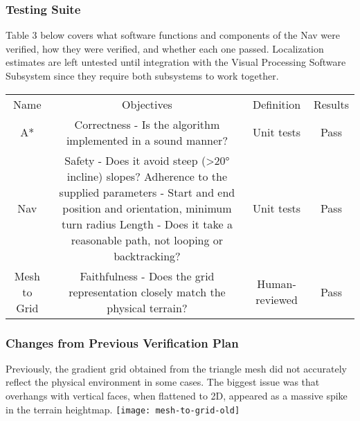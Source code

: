 \subsubsection{Testing Suite}\label{subsubsec:testing-suite}
Table 3 below covers what software functions and components of the Nav were verified, how they were verified, and
whether each one passed.
Localization estimates are left untested until integration with the Visual Processing Software Subsystem since they
require both subsystems to work together.
\begin{center}
    \begin{tabular}{ |c|c|c|c| }
        Name & Objectives & Definition & Results \\
        A* & Correctness - Is the algorithm implemented in a sound manner? & Unit tests & Pass \\
        Nav & Safety - Does it avoid steep (>20° incline) slopes? Adherence to the supplied parameters - Start and end position and orientation, minimum turn radius Length - Does it take a reasonable path, not looping or backtracking? & Unit tests & Pass \\
        Mesh to Grid & Faithfulness - Does the grid representation closely match the physical terrain? & Human-reviewed & Pass
    \end{tabular}
\end{center}
\subsubsection{Changes from Previous Verification Plan}\label{subsubsec:changes-to-plan}
Previously, the gradient grid obtained from the triangle mesh did not accurately reflect the physical environment in
some cases.
The biggest issue was that overhangs with vertical faces, when flattened to 2D, appeared as a massive spike in the
terrain heightmap.
\texttt{[image: mesh-to-grid-old]}
